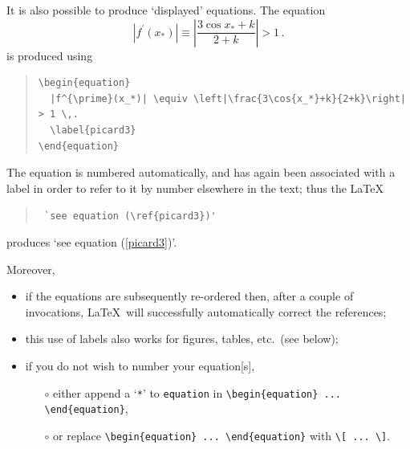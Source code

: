 It is also possible to produce `displayed' equations.  The equation
\begin{equation}
  |f^{\prime}(x_*)| \equiv \left|\frac{3\cos{x_*}+k}{2+k}\right| > 1 \,.
  \label{picard3}
\end{equation}
is produced using
\begin{quote}
\begin{verbatim}
\begin{equation}
  |f^{\prime}(x_*)| \equiv \left|\frac{3\cos{x_*}+k}{2+k}\right| > 1 \,.
  \label{picard3}
\end{equation}
\end{verbatim}
\end{quote}
The equation is numbered automatically, and has again been associated
with a label in order to refer to it by number elsewhere in the text;
thus the \LaTeX
\begin{quote}
  \verb| `see equation (\ref{picard3})'|
\end{quote}
produces `see equation (\ref{picard3})'.

Moreover,
\begin{itemize}
\item if the equations are subsequently re-ordered then, after a
  couple of invocations, \LaTeX\ will successfully automatically
  correct the references;
\item this use of labels also works for figures, tables, etc.\ (see
  below);
\item if you do not wish to number your equation[s],
  \begin{itemize}
  \item[$\circ$] either append a `\verb|*|' to \verb|equation| in
    \verb|\begin{equation} ... \end{equation}|,
  \item[$\circ$] or replace \verb|\begin{equation} ... \end{equation}| with
    \verb|\[ ... \]|.
  \end{itemize}
\end{itemize}


